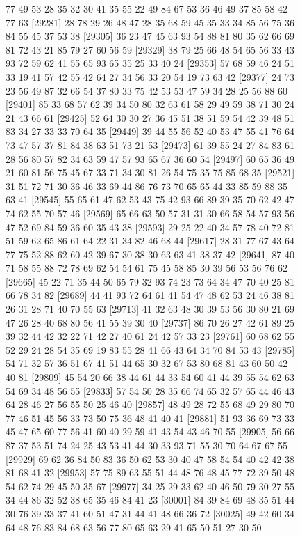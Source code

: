 \documentclass{article}
\begin{document}
\begin{figure}[H]
\begin{Schunk}
\begin{Soutput}
[29257] 77 49 53 28 35 32 30 41 35 55 22 49 84 67 53 36 46 49 37 85 58 42 77 63
[29281] 28 78 29 26 48 47 28 35 68 59 45 35 33 34 85 56 75 36 84 55 45 37 53 38
[29305] 36 23 47 45 63 93 54 88 81 80 35 62 66 69 81 72 43 21 85 79 27 60 56 59
[29329] 38 79 25 66 48 54 65 56 33 43 93 72 59 62 41 55 65 93 65 35 25 33 40 24
[29353] 57 68 59 46 24 51 33 19 41 57 42 55 42 64 27 34 56 33 20 54 19 73 63 42
[29377] 24 73 23 56 49 87 32 66 54 37 80 33 75 42 53 53 47 59 34 28 25 56 88 60
[29401] 85 33 68 57 62 39 34 50 80 32 63 61 58 29 49 59 38 71 30 24 21 43 66 61
[29425] 52 64 30 30 27 36 45 51 38 51 59 54 42 39 48 51 83 34 27 33 33 70 64 35
[29449] 39 44 55 56 52 40 53 47 55 41 76 64 73 47 57 37 81 84 38 63 51 73 21 53
[29473] 61 39 55 24 27 84 83 61 28 56 80 57 82 34 63 59 47 57 93 65 67 36 60 54
[29497] 60 65 36 49 21 60 81 56 75 45 67 33 71 34 30 81 26 54 75 35 75 85 68 35
[29521] 31 51 72 71 30 36 46 33 69 44 86 76 73 70 65 65 44 33 85 59 88 35 63 41
[29545] 55 65 61 47 62 53 43 75 42 93 66 89 39 35 70 62 42 47 74 62 55 70 57 46
[29569] 65 66 63 50 57 31 31 30 66 58 54 57 93 56 47 52 69 84 59 36 60 35 43 38
[29593] 29 25 22 40 34 57 78 40 72 81 51 59 62 65 86 61 64 22 31 34 82 46 68 44
[29617] 28 31 77 67 43 64 77 75 52 88 62 60 42 39 67 30 38 30 63 63 41 38 37 42
[29641] 87 40 71 58 55 88 72 78 69 62 54 54 61 75 45 58 85 30 39 56 53 56 76 62
[29665] 45 22 71 35 44 50 65 79 32 93 74 23 73 64 34 47 70 40 25 81 66 78 34 82
[29689] 44 41 93 72 64 61 41 54 47 48 62 53 24 46 38 81 26 31 28 71 40 70 55 63
[29713] 41 32 63 48 30 39 53 56 30 80 21 69 47 26 28 40 68 80 56 41 55 39 30 40
[29737] 86 70 26 27 42 61 89 25 39 32 44 42 32 22 71 42 27 40 61 24 42 57 33 23
[29761] 60 68 62 55 52 29 24 28 54 35 69 19 83 55 28 41 66 43 64 34 70 84 53 43
[29785] 54 71 32 57 36 51 67 41 51 44 65 30 32 67 53 80 68 81 43 60 50 42 40 81
[29809] 45 54 20 66 38 44 61 44 33 54 60 41 44 39 55 54 62 63 54 69 34 48 56 55
[29833] 57 54 50 28 35 66 74 65 32 57 65 44 46 43 64 28 46 27 56 55 50 25 46 40
[29857] 48 49 28 72 55 68 49 29 80 70 77 46 51 45 56 33 73 50 75 36 48 41 40 41
[29881] 51 93 36 69 73 33 45 47 65 60 77 56 41 60 40 29 59 41 43 54 43 46 70 55
[29905] 56 66 87 37 53 51 74 24 25 43 53 41 44 30 33 93 71 55 30 70 64 67 67 55
[29929] 69 62 36 84 50 83 36 50 62 53 30 40 47 58 54 54 40 42 42 38 81 68 41 32
[29953] 57 75 89 63 55 51 44 48 76 48 45 77 72 39 50 48 54 62 74 29 45 50 35 67
[29977] 34 25 29 33 62 40 46 50 79 30 27 55 34 44 86 32 52 38 65 35 46 84 41 23
[30001] 84 39 84 69 48 35 51 44 30 76 39 33 37 41 60 51 47 31 44 41 48 66 36 72
[30025] 49 42 60 34 64 48 76 83 84 68 63 56 77 80 65 63 29 41 65 50 51 27 30 50

\end{Soutput}
\end{Schunk}
\end{figure}
\end{document}
